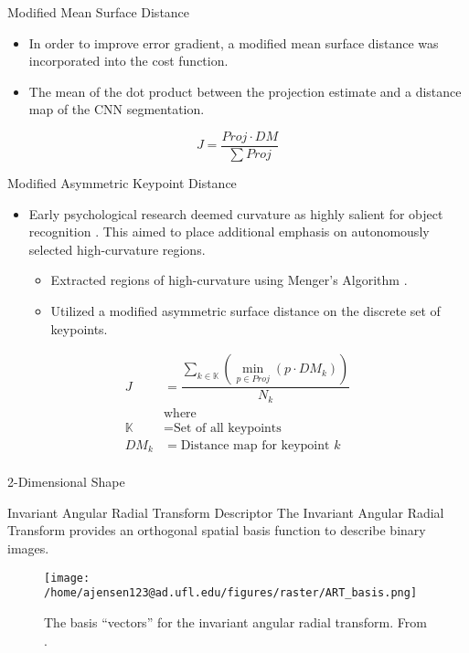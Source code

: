 \documentclass[presentation, aspectratio=1610]{beamer}
\begin{document}
\begin{frame}[label={sec:org61799f6}]{Modified Mean Surface Distance}
\begin{itemize}
\item In order to improve error gradient, a modified mean surface distance was incorporated into the cost function.
\item The mean of the dot product between the projection estimate and a distance map of the CNN segmentation.
\end{itemize}
\begin{equation}
  \label{eq:DMCF}
  J = \dfrac{Proj \cdot DM}{\sum Proj}
\end{equation}
\end{frame}
\begin{frame}[label={sec:org41dcc69}]{Modified Asymmetric Keypoint Distance}
\begin{itemize}
\item Early psychological research deemed curvature as highly salient for object recognition \autocites{attneaveInformationalAspectsVisual1954}[][]{attneaveQuantitativeStudyShape1956}. This aimed to place additional emphasis on autonomously selected high-curvature regions.
\begin{itemize}
\item Extracted regions of high-curvature using Menger's Algorithm \autocite{legerMengerCurvatureRectifiability1999}.
\item Utilized a modified asymmetric surface distance on the discrete set of keypoints.
\end{itemize}
\end{itemize}

\begin{equation}
  \label{eq:curv-keypoint}
  \begin{split}
    \displaystyle J &= \dfrac{\sum_{k \in \mathbb{K}}(\min_{p\in Proj}(p \cdot DM_{k}))}{N_k} \\
      &\text{where}\\
    \mathbb{K} &= \text{Set of all keypoints} \\
    DM_{k} &= \text{Distance map for keypoint $k$} \\
  \end{split}
\end{equation}
\end{frame}
\begin{frame}[label={sec:org3faff67}]{2-Dimensional Shape}
\end{frame}
\begin{frame}[label={sec:org7fea3aa}]{Invariant Angular Radial Transform Descriptor}
The Invariant Angular Radial Transform provides an orthogonal spatial basis function to describe binary images.

\begin{figure}[htbp]
\centering
\texttt{[image: /home/ajensen123@ad.ufl.edu/figures/raster/ART\_basis.png]}
\caption{The basis ``vectors'' for the invariant angular radial transform. From \autocite{leeNewShapeDescription2012}.}
\end{figure}
\end{frame}
\end{document}
